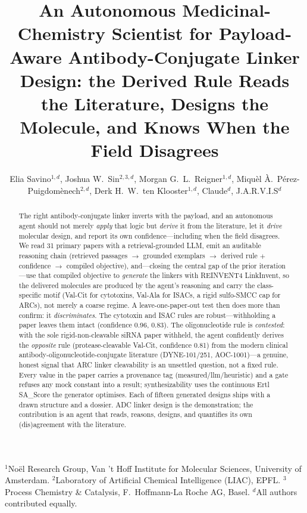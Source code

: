 \documentclass[10pt]{article}
\title{\textbf{An Autonomous Medicinal-Chemistry Scientist for Payload-Aware Antibody-Conjugate Linker Design: the Derived Rule Reads the Literature, Designs the Molecule, and Knows When the Field Disagrees}}
\author{Elia Savino$^{1,d}$, Joshua W.\ Sin$^{2,3,d}$, Morgan G.\ L.\ Reigner$^{1,d}$, Miqu\`el \`A.\ P\'erez-Puigdom\`enech$^{2,d}$, Derk H.\ W.\ ten Klooster$^{1,d}$, Claude$^{d}$, J.A.R.V.I.S$^{d}$}
\date{}
\begin{document}
\maketitle
\begin{center}\footnotesize $^{1}$No\"el Research Group, Van 't Hoff Institute for Molecular Sciences, University of Amsterdam. $^{2}$Laboratory of Artificial Chemical Intelligence (LIAC), EPFL. $^{3}$Process Chemistry \& Catalysis, F.\ Hoffmann-La Roche AG, Basel. $^{d}$All authors contributed equally.\end{center}
\begin{abstract}The right antibody-conjugate linker inverts with the payload, and an autonomous agent should not merely \emph{apply} that logic but \emph{derive} it from the literature, let it \emph{drive} molecular design, and report its own confidence---including when the field disagrees. We read 31 primary papers with a retrieval-grounded LLM, emit an auditable reasoning chain (retrieved passages $\rightarrow$ grounded exemplars $\rightarrow$ derived rule $+$ confidence $\rightarrow$ compiled objective), and---closing the central gap of the prior iteration---use that compiled objective to \emph{generate} the linkers with REINVENT4 LinkInvent, so the delivered molecules are produced by the agent's reasoning and carry the class-specific motif (Val-Cit for cytotoxins, Val-Ala for ISACs, a rigid sulfo-SMCC cap for ARCs), not merely a coarse regime. A leave-one-paper-out test then does more than confirm: it \emph{discriminates}. The cytotoxin and ISAC rules are robust---withholding a paper leaves them intact (confidence 0.96, 0.83). The oligonucleotide rule is \emph{contested}: with the sole rigid-non-cleavable siRNA paper withheld, the agent confidently derives the \emph{opposite} rule (protease-cleavable Val-Cit, confidence 0.81) from the modern clinical antibody-oligonucleotide-conjugate literature (DYNE-101/251, AOC-1001)---a genuine, honest signal that ARC linker cleavability is an unsettled question, not a fixed rule. Every value in the paper carries a provenance tag (measured/llm/heuristic) and a gate refuses any mock constant into a result; synthesizability uses the continuous Ertl SA\_Score the generator optimises. Each of fifteen generated designs ships with a drawn structure and a dossier. ADC linker design is the demonstration; the contribution is an agent that reads, reasons, designs, and quantifies its own (dis)agreement with the literature.\end{abstract}
\end{document}
